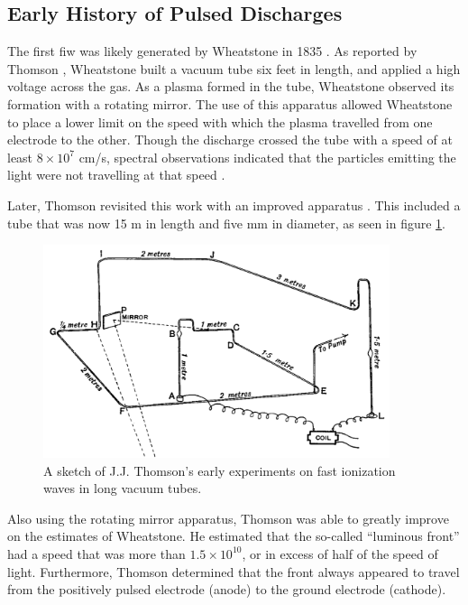 \subsection{Early History of Pulsed Discharges}

The first \acs{fiw} was likely generated by Wheatstone in 1835
\cite{Wheatstone1835}. As reported by Thomson \cite{Thomson1893}, Wheatstone
built a vacuum tube six feet in length, and applied a high voltage across the
gas. As a plasma formed in the tube, Wheatstone observed its formation with a
rotating mirror. The use of this apparatus allowed Wheatstone to place a lower
limit on the speed with which the plasma travelled from one electrode to the
other. Though the discharge crossed the tube with a speed of at least
$8\times10^7$ cm/s, spectral observations indicated that the particles emitting
the light were not travelling at that speed \cite{Zahn1879}.

Later, Thomson revisited this work with an improved apparatus
\cite{Thomson1893}. This included a tube that was now 15 m in length and five mm
in diameter, as seen in figure \ref{fig:thomson}.
\begin{figure}
  \centering
  \includegraphics[width=4in]{chapters/introduction/figures/thomson.png}
  \caption{A sketch of J.J. Thomson's early experiments on fast ionization
  waves in long vacuum tubes.}\label{fig:thomson}
\end{figure}
Also using the rotating mirror apparatus, Thomson was able to greatly improve on
the estimates of Wheatstone. He estimated that the so-called ``luminous front''
had a speed that was more than $1.5\times10^{10}$, or in excess of half of the
speed of light. Furthermore, Thomson determined that the front always appeared
to travel from the positively pulsed electrode (anode) to the ground electrode
(cathode).

